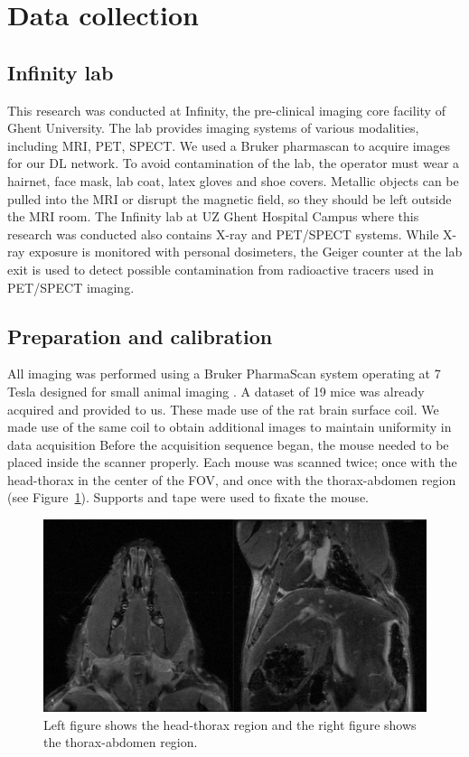 \documentclass[twocolumn]{article}
\begin{document}
\section{Data collection}
\subsection{Infinity lab}

This research was conducted at Infinity, the pre-clinical imaging core facility of Ghent University. 
The lab provides imaging systems of various modalities, including MRI, PET, SPECT.
We used a Bruker pharmascan to acquire images for our DL network. To avoid contamination of the lab, the operator must wear a hairnet, face mask, lab coat, latex gloves and shoe covers. 
Metallic objects can be pulled into the MRI or disrupt the magnetic field, so they should be left outside the MRI room. 
The Infinity lab at UZ Ghent Hospital Campus where this research was conducted also contains X-ray and PET/SPECT systems. 
While X-ray exposure is monitored with personal dosimeters, the Geiger counter at the lab exit is used to detect possible contamination from radioactive tracers used in PET/SPECT imaging.

\subsection{Preparation and calibration }

All imaging was performed using a Bruker PharmaScan system operating at 7 Tesla designed for small animal imaging \cite{bruker2025pharmascan}. 
A dataset of 19 mice was already acquired and provided to us. These made use of the rat brain surface coil. We made use of the same coil to obtain additional images to maintain uniformity in data acquisition
Before the acquisition sequence began, the mouse needed to be placed inside the scanner properly. 
Each mouse was scanned twice; once with the head-thorax in the center of the FOV, and once with the thorax-abdomen region (see Figure~\ref{fig:head-thorax}). 
Supports and tape were used to fixate the mouse. 

\begin{figure}[H]
    \centering
    \includegraphics[width=0.95\linewidth]{head-thorax.png}
    \caption{Left figure shows the head-thorax region and the right figure shows the thorax-abdomen region.}
    \label{fig:head-thorax}
\end{figure}
\end{document}
